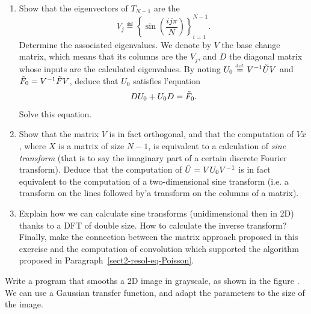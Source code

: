 \begin{exo}
\begin{enumerate}
\item Show that the eigenvectors of $ T_{N-1} $ are the
\begin{equation*}
V_j \eqdef \left\{\sin \left(\frac{ij \pi}{N} \right) \right\}_{i = 1}^{N-1}.
\end{equation*}
Determine the associated eigenvalues. We denote by $ V $ the base change matrix, which means that its columns are the $ V_j $, and $ D $ the diagonal matrix whose inputs are the calculated eigenvalues. By noting $ U_0 \stackrel{\mbox{\upshape\tiny def.}}{=} V^{-1} \tilde{U} V $ and $ \tilde{F}_0 = V^{-1} \tilde{F} V $, deduce that $ U_0 $ satisfies l'equation
\begin{equation*}
D U_0 + U_0 D = \tilde{F}_0.
\end{equation*}
Solve this equation.
\item {} Show that the matrix $ V $ is in fact orthogonal, and that the computation of $ V x $, where $ X $ is a matrix of size $ N-1 $, is equivalent to a calculation of \textit{sine transform} (that is to say the imaginary part of a certain discrete Fourier transform). Deduce that the computation of $ \tilde{U} = V U_0 V^{-1} $ is in fact equivalent to the computation of a two-dimensional sine transform (i.e. a transform on the lines followed by'a transform on the columns of a matrix).
\item Explain how we can calculate sine transforms (unidimensional then in 2D) thanks to a DFT of double size. How to calculate the inverse transform? Finally, make the connection between the matrix approach proposed in this exercise and the computation of convolution which supported the algorithm proposed in Paragraph~\ref{sect2-resol-eq-Poisson}.
\end{enumerate}
\end{exo}
 
 
\begin{exo}
\label{exo-lissage-image}
 
    Write a program that smooths a 2D image in grayscale, as shown in the figure . We can use a Gaussian transfer function, and adapt the parameters to the size of the image.
\end{exo}
 
